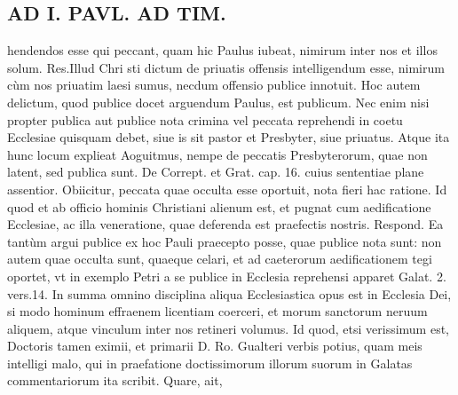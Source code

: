 \documentclass{article}
\begin{document}
\begin{pages}
\section*{AD I. PAVL. AD TIM. }
\marginpar{[ p.JI0 ]}\pstart hendendos esse qui peccant, quam hic Paulus iubeat, nimirum inter nos et illos solum. Res.Illud Chri sti dictum de priuatis offensis intelligendum esse, nimirum cùm nos priuatim laesi sumus, necdum offensio publice innotuit. Hoc autem delictum, quod publice docet arguendum Paulus, est publicum. Nec enim nisi propter publica aut publice nota crimina vel peccata reprehendi in coetu Ecclesiae quisquam debet, siue is sit pastor et Presbyter, siue priuatus. Atque ita hunc locum explieat Aoguitmus, nempe de peccatis Presbyterorum, quae non latent, sed publica sunt. De Corrept. et Grat. cap. 16. cuius sententiae plane assentior.  \pend{} Obiicitur, peccata quae occulta esse oportuit, nota fieri hac ratione. Id quod et ab officio hominis Christiani alienum est, et pugnat cum aedificatione Ecclesiae, ac illa veneratione, quae deferenda est praefectis nostris. Respond. Ea tantùm argui publice ex hoc Pauli praecepto posse, quae publice nota sunt: non autem quae occulta sunt, quaeque celari, et ad caeterorum aedificationem tegi oportet, vt in exemplo Petri a se publice in Ecclesia reprehensi apparet Galat. 2. vers.14. In summa omnino disciplina aliqua Ecclesiastica opus est in Ecclesia Dei, si modo hominum effraenem licentiam coerceri, et morum sanctorum neruum aliquem, atque vinculum inter nos retineri volumus. Id quod, etsi verissimum est, Doctoris tamen eximii, et primarii D. Ro. Gualteri verbis potius, quam meis intelligi malo, qui in praefatione doctissimorum illorum suorum in Galatas commentariorum ita scribit. Quare, ait,  \pend

\end{pages}
\end{document}
